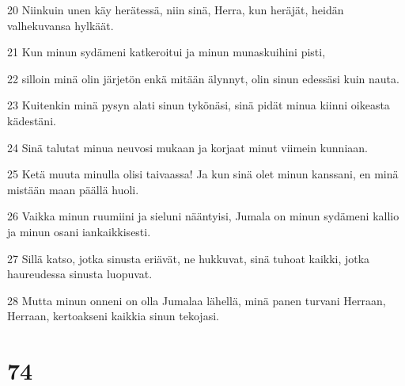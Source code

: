 \par 20 Niinkuin unen käy herätessä, niin sinä, Herra, kun heräjät, heidän valhekuvansa hylkäät.
\par 21 Kun minun sydämeni katkeroitui ja minun munaskuihini pisti,
\par 22 silloin minä olin järjetön enkä mitään älynnyt, olin sinun edessäsi kuin nauta.
\par 23 Kuitenkin minä pysyn alati sinun tykönäsi, sinä pidät minua kiinni oikeasta kädestäni.
\par 24 Sinä talutat minua neuvosi mukaan ja korjaat minut viimein kunniaan.
\par 25 Ketä muuta minulla olisi taivaassa! Ja kun sinä olet minun kanssani, en minä mistään maan päällä huoli.
\par 26 Vaikka minun ruumiini ja sieluni nääntyisi, Jumala on minun sydämeni kallio ja minun osani iankaikkisesti.
\par 27 Sillä katso, jotka sinusta eriävät, ne hukkuvat, sinä tuhoat kaikki, jotka haureudessa sinusta luopuvat.
\par 28 Mutta minun onneni on olla Jumalaa lähellä, minä panen turvani Herraan, Herraan, kertoakseni kaikkia sinun tekojasi.

\chapter{74}

